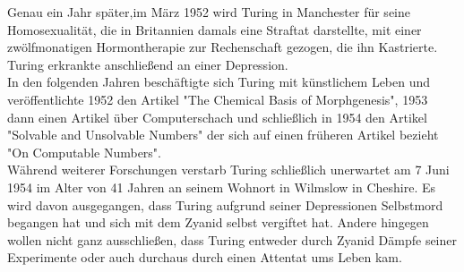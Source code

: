 Genau ein Jahr später,im März 1952 wird Turing in Manchester für seine Homosexualität, die in Britannien damals eine Straftat darstellte, mit einer zwölfmonatigen Hormontherapie zur Rechenschaft gezogen, die ihn Kastrierte. Turing erkrankte anschließend an einer Depression.\\
In den folgenden Jahren beschäftigte sich Turing mit künstlichem Leben und veröffentlichte 1952 den Artikel "The Chemical Basis of Morphgenesis", 1953 dann einen Artikel über Computerschach und schließlich in 1954 den Artikel "Solvable and Unsolvable Numbers" der sich auf einen früheren Artikel bezieht "On Computable Numbers".\\
Während weiterer Forschungen verstarb Turing schließlich unerwartet am 7 Juni 1954 im Alter von 41 Jahren an seinem Wohnort in Wilmslow in Cheshire. Es wird davon ausgegangen, dass Turing aufgrund seiner Depressionen Selbstmord begangen hat und sich mit dem Zyanid selbst vergiftet hat. Andere hingegen wollen nicht ganz ausschließen, dass Turing entweder durch Zyanid Dämpfe seiner Experimente oder auch durchaus durch einen Attentat ums Leben kam. 

